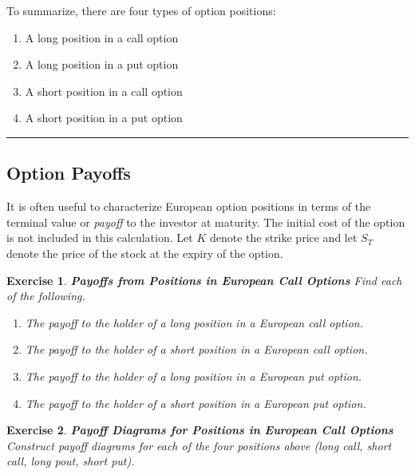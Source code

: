 \documentclass[letterpaper,10pt]{article}
\newtheorem{ex}{Exercise}
\begin{document}
To summarize, there are four types of option positions:

\begin{enumerate}

\item A long position in a call option

\item A long position in a put option

\item A short position in a call option

\item A short position in a put option

\end{enumerate}

\bigskip

\hrule

\bigskip

\subsection{Option Payoffs}

It is often useful to characterize European option positions in terms of the terminal value or {\em payoff} to the investor at maturity.  The initial cost of the option is not included in this calculation.  Let $K$ denote the strike price and let $S_T$ denote the price of the stock at the expiry of the option.  

\begin{ex}{\bf Payoffs from Positions in European Call Options}
Find each of the following.
\begin{enumerate}
\item[(a)] The payoff to the holder of a long position in a European call option.

\item[(b)] The payoff to the holder of a short position in a European call option.


\item[(c)] The payoff to the holder of a long position in a European put option.


\item[(d)] The payoff to the holder of a short position in a European put option.



\end{enumerate}
\end{ex}

\begin{ex}{\bf Payoff Diagrams for Positions in European Call Options}
Construct payoff diagrams for each of the four positions above (long call, short call, long pout, short put).
\end{ex}
\end{document}
